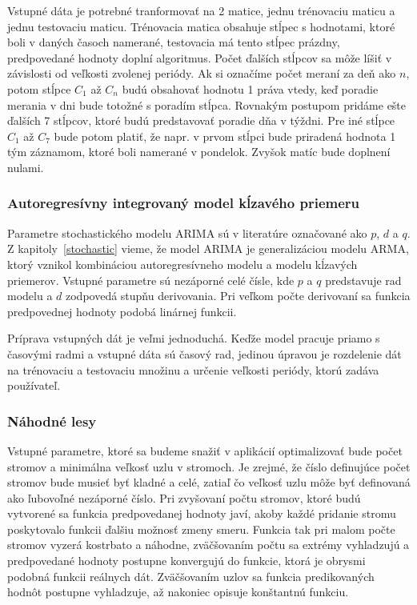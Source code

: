 \documentclass[a4paper,slovak,12pt,appendix]{article}
\begin{document}
Vstupné dáta je potrebné tranformovať na 2 matice, jednu trénovaciu maticu
a jednu testovaciu maticu. Trénovacia matica obsahuje stĺpec s hodnotami,
ktoré boli v daných časoch namerané, testovacia má tento stĺpec prázdny,
predpovedané hodnoty doplní algoritmus. Počet ďalších stĺpcov sa môže líšiť
v závislosti od veľkosti zvolenej periódy. Ak si označíme počet meraní za deň
ako $n$, potom stĺpce $C_1$ až $C_n$ budú obsahovať hodnotu 1 práva vtedy,
keď poradie merania v dni bude totožné s poradím stĺpca. Rovnakým postupom
pridáme ešte ďalších 7 stĺpcov, ktoré budú predstavovať poradie dňa v týždni.
Pre iné stĺpce $C_1$ až $C_7$ bude potom platiť, že napr. v prvom stĺpci bude
priradená hodnota 1 tým záznamom, ktoré boli namerané v pondelok. Zvyšok matíc
bude doplnení nulami.

\subsubsection{Autoregresívny integrovaný model kĺzavého priemeru}
Parametre stochastického modelu ARIMA sú v literatúre označované ako $p$, $d$
a $q$. Z kapitoly~\ref{stochastic} vieme, že model ARIMA je generalizáciou
modelu ARMA, ktorý vznikol kombináciou autoregresívneho modelu a modelu
kĺzavých priemerov. Vstupné parametre sú nezáporné celé čísle, kde $p$ a $q$
predstavuje rad modelu a $d$ zodpovedá stupňu derivovania. Pri veľkom počte
derivovaní sa funkcia predpovednej hodnoty podobá linárnej funkcii.

Príprava vstupných dát je veľmi jednoduchá. Keďže model pracuje priamo
s časovými radmi a vstupné dáta sú časový rad, jedinou úpravou je rozdelenie dát
na trénovaciu a testovaciu množinu a určenie veľkosti periódy, ktorú zadáva
používateľ.

\subsubsection{Náhodné lesy}
Vstupné parametre, ktoré sa budeme snažiť v aplikácií optimalizovať bude počet
stromov a minimálna veľkosť uzlu v stromoch. Je zrejmé, že číslo definujúce
počet stromov bude musieť byť kladné a celé, zatiaľ čo veľkosť uzlu môže byť
definovaná ako ľubovoľné nezáporné číslo. Pri zvyšovaní počtu stromov, ktoré
budú vytvorené sa funkcia predpovedanej hodnoty javí, akoby každé pridanie stromu
poskytovalo funkcii ďalšiu možnosť zmeny smeru. Funkcia tak pri malom počte
stromov vyzerá kostrbato a náhodne, zväčšovaním počtu sa extrémy vyhladzujú a
predpovedané hodnoty postupne konvergujú do funkcie, ktorá je obrysmi podobná
funkcii reálnych dát. Zväčšovaním uzlov sa funkcia predikovaných hodnôt
postupne vyhladzuje, až nakoniec opisuje konštantnú funkciu.
\end{document}
